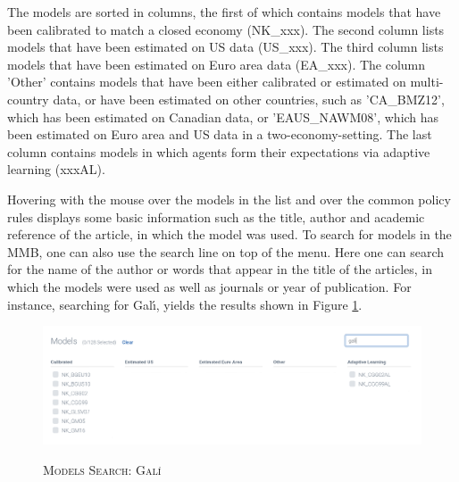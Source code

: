 The models are sorted in columns, the first of which contains models that have been calibrated to match a closed economy (NK\_xxx). The second column lists models that have been estimated on US data (US\_xxx). The third column lists models that have been estimated on Euro area data (EA\_xxx). The column 'Other' contains models that have been either calibrated or estimated on multi-country data, or have been estimated on other countries, such as 'CA\_BMZ12', which has been estimated on Canadian data, or 'EAUS\_NAWM08', which has been estimated on Euro area and US data in a two-economy-setting. The last column contains models in which agents form their expectations via adaptive learning (xxxAL). 


Hovering with the mouse over the models in the list and over the common policy rules displays some basic information such as the title, author and academic reference of the article, in which the model was used. To search for models in the MMB, one can also use the search line on top of the menu. Here one can search for the name of the author or words that appear in the title of the articles, in which the models were used as well as journals or year of publication. For instance, searching for Gal{\'\i}, yields the results shown in Figure \ref{search}.

\begin{figure}[H]
	\centering
	\caption{\textsc{Models Search: Gal{\'\i}}}
	\vspace{0.2cm}
	\includegraphics[width=15cm,keepaspectratio]{gali.png}\\
	\label{search}
\end{figure}

